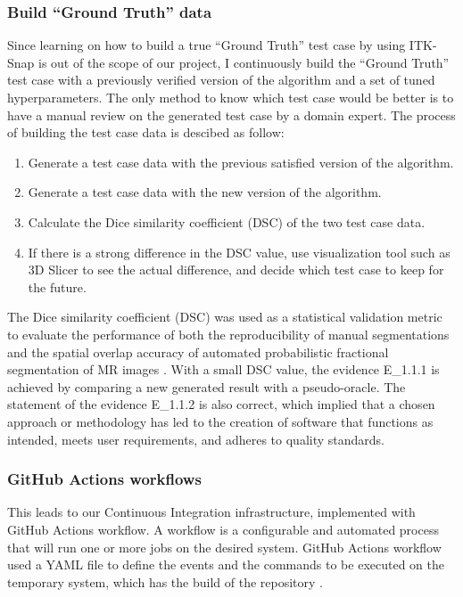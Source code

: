 \subsubsection{Build ``Ground Truth'' data}
Since learning on how to build a true ``Ground Truth'' test case by  using ITK-Snap is out of the scope of our project, I continuously build the ``Ground Truth'' test case with a previously verified version of the algorithm and a set of tuned hyperparameters. The only method to know which test case would be better is to have a manual review on  the generated  test case by a domain expert. The process of building the test case data is descibed as follow:

\begin{enumerate}
  \item Generate a test case data with the previous satisfied version of the algorithm.
  \item Generate a test case data with the new version of the algorithm.
  \item Calculate the Dice similarity coefficient (DSC) of the two test case data.
  \item If there is a strong difference in the DSC value, use visualization tool such as 3D Slicer to see the actual difference, and decide which test case to keep for the future.
\end{enumerate}

The Dice similarity coefficient (DSC) was used as a statistical validation metric to evaluate the performance of both the reproducibility of manual segmentations and the spatial overlap accuracy of automated probabilistic fractional segmentation of MR images \cite{ZOU2004178}. With a small DSC value, the evidence E\_1.1.1 is achieved by comparing a new generated result with a pseudo-oracle. The statement of the evidence E\_1.1.2 is also correct, which implied that a chosen approach or methodology has led to the creation of software that functions as intended, meets user requirements, and adheres to quality standards.

\subsubsection{GitHub Actions workflows}
This leads to our Continuous Integration infrastructure, implemented with GitHub Actions workflow. A workflow is a configurable and automated process that will run one or more jobs on the desired system. GitHub Actions workflow used a YAML file to define the events and the commands to be executed on the temporary system, which has the build of the repository \cite{GitHubActions}.

